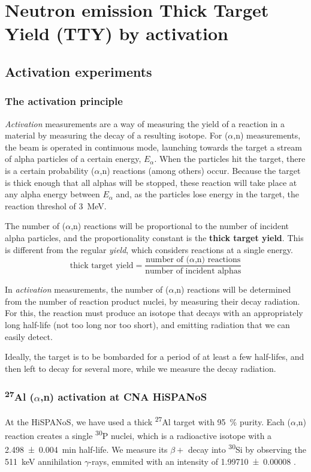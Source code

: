 \documentclass[a4paper,12pt]{report}
\newcommand{\an}{($\alpha$,n) }
\newcommand{\Aliso}{\textsuperscript{27}Al }
\newcommand{\Piso}{\textsuperscript{30}P }
\begin{document}

\chapter{Neutron emission Thick Target Yield (TTY) by activation}

\section{Activation experiments}

\subsection{The activation principle}
\textit{Activation} measurements are a way of measuring the yield of a reaction in a material by measuring the decay of a resulting isotope.
For \an measurements, the beam is operated in continuous mode, launching towards the target a stream of alpha particles of a certain energy, $E_\alpha$.
When the particles hit the target, there is a certain probability \an reactions (among others) occur.
Because the target is thick enough that all alphas will be stopped, these reaction will take place at any alpha energy between $E_\alpha$ and, as the particles lose energy in the target, the reaction threshol of \qty{3}{\MeV}.

The number of \an reactions will be proportional to the number of incident alpha particles, and the proportionality constant is the \textbf{thick target yield}.
This is different from the regular \textit{yield}, which considers reactions at a single energy.
\begin{equation}
	\text{thick target yield} = \frac{\text{number of \an reactions}}{\text{number of incident alphas}}
	\label{tty_def}
\end{equation}

In \textit{activation} measurements, the number of \an reactions will be determined from the number of reaction product nuclei, by measuring their decay radiation.
For this, the reaction must produce an isotope that decays with an appropriately long half-life (not too long nor too short), and emitting radiation that we can easily detect.

Ideally, the target is to be bombarded for a period of at least a few half-lifes, and then left to decay for several more, while we measure the decay radiation.

\subsection{\Aliso\an activation at CNA HiSPANoS}
At the HiSPANoS, we have used a thick \Aliso target with \qty{95}{\percent} purity.
Each \an reaction creates a single \Piso nuclei, which is a radioactive isotope with a \qty{2.498(4)}{\minute} half-life.
We measure its $\beta +$ decay into \textsuperscript{30}Si by observing the \qty{511}{\keV} annihilation $\gamma$-rays, emmited with an intensity of \num{1.99710(8)} \cite{nucleardatasheets}.
\end{document}
